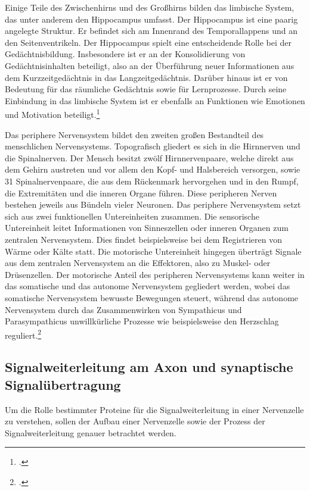 Einige Teile des Zwischenhirns und des Großhirns bilden das
limbische System, das unter anderem den Hippocampus umfasst.
Der Hippocampus ist eine paarig angelegte Struktur. Er befindet
sich am Innenrand des Temporallappens und an den Seitenventrikeln. Der
Hippocampus spielt eine entscheidende Rolle bei der Gedächtnisbildung.
Insbesondere ist er an der Konsolidierung von Gedächtnisinhalten
beteiligt, also an der Überführung neuer Informationen aus dem
Kurzzeitgedächtnis in das Langzeitgedächtnis. Darüber hinaus ist er von
Bedeutung für das räumliche Gedächtnis sowie für Lernprozesse. Durch
seine Einbindung in das limbische System ist er ebenfalls an Funktionen
wie Emotionen und Motivation
beteiligt.\footcite{Hoegemann2006}

Das periphere Nervensystem bildet den zweiten großen Bestandteil
des menschlichen Nervensystems. Topografisch gliedert es sich in die
Hirnnerven und die Spinalnerven. Der Mensch besitzt zwölf
Hirnnervenpaare, welche direkt aus dem Gehirn austreten und vor allem
den Kopf- und Halsbereich versorgen, sowie 31 Spinalnervenpaare, die aus
dem Rückenmark hervorgehen und in den Rumpf, die Extremitäten und die
inneren Organe führen. Diese peripheren Nerven bestehen jeweils
aus Bündeln vieler Neuronen. Das periphere Nervensystem setzt sich aus
zwei funktionellen Untereinheiten zusammen. Die sensorische Untereinheit
leitet Informationen von Sinneszellen oder inneren Organen zum zentralen
Nervensystem. Dies findet beispielsweise bei dem Registrieren von Wärme
oder Kälte statt. Die motorische Untereinheit hingegen überträgt Signale
aus dem zentralen Nervensystem an die Effektoren, also zu Muskel- oder
Drüsenzellen. Der motorische Anteil des peripheren Nervensystems kann
weiter in das somatische und das autonome Nervensystem gegliedert
werden, wobei das somatische Nervensystem bewusste Bewegungen steuert,
während das autonome Nervensystem durch das Zusammenwirken von
Sympathicus und Parasympathicus unwillkürliche Prozesse wie
beispielsweise den Herzschlag
reguliert.\footcite[S.~1100--1102]{Markl1997}


\subsection{Signalweiterleitung am Axon und synaptische Signalübertragung}

Um die Rolle bestimmter Proteine für die Signalweiterleitung in einer
Nervenzelle zu verstehen, sollen der Aufbau einer Nervenzelle sowie der
Prozess der Signalweiterleitung genauer betrachtet werden.

